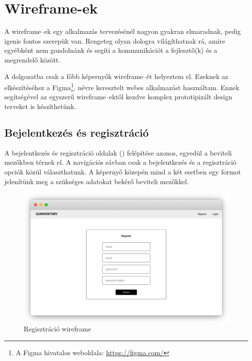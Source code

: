 \chapter{Wireframe-ek}

A wireframe–ek egy alkalmazás tervezésénél nagyon gyakran elmaradnak, pedig igenis fontos szerepük van.
Rengeteg olyan dologra világíthatnak rá, amire egyébként nem gondolnánk és segíti a kommunikációt a fejlesztő(k) és a megrendelő között.

A dolgozatba csak a főbb képernyők wireframe–ét helyeztem el. Ezeknek az elkészítéséhez a Figma\footnote{A Figma hivatalos weboldala: \url{https://figma.com/}}. névre keresztelt webes alkalmazást használtam. 
Ennek segítségével az egyszerű wireframe–ektől kezdve komplex prototipizált design terveket is készíthetünk.

\section{Bejelentkezés és regisztráció}
A bejelentkezés és regisztráció oldalak () felépítése azonos, egyedül a beviteli mezőkben térnek el.
A navigációs sávban csak a bejelentkezés és a regisztráció opciók közül választhatunk. A képernyő közepén mind a két esetben egy formot jelenítünk meg a szükséges adatokat bekérő beviteli mezőkkel.
\begin{figure}[!ht]
  \centering
  \includegraphics[width=150mm, keepaspectratio]{figures/wireframes/frame_registration.png}
  \caption{Regisztráció wireframe}
  \label{fig:RegistrationWireframe}
\end{figure}


